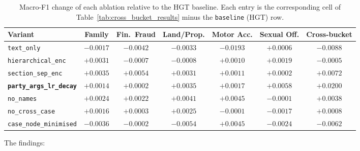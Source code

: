 \begin{table}[H]
  \centering
  \scriptsize
  \setlength{\tabcolsep}{4pt}
  \begin{adjustbox}{max width=\textwidth}
  \begin{tabular}{lcccccc}
    \toprule
    Variant & Family & Fin.\ Fraud & Land/Prop. & Motor Acc. & Sexual Off. & Cross-bucket \\
    \midrule
    \texttt{text\_only} & $-0.0017$ & $-0.0042$ & $-0.0033$ & $-0.0193$ & $+0.0006$ & $-0.0088$ \\
    \texttt{hierarchical\_enc} & $+0.0031$ & $-0.0007$ & $-0.0008$ & $+0.0010$ & $+0.0019$ & $-0.0005$ \\
    \texttt{section\_sep\_enc} & $+0.0035$ & $+0.0054$ & $+0.0031$ & $+0.0011$ & $+0.0002$ & $+0.0072$ \\
    \textbf{\texttt{party\_args\_lr\_decay}} & $+0.0014$ & $+0.0002$ & $+0.0035$ & $+0.0017$ & $+0.0058$ & $\mathbf{+0.0200}$ \\
    \texttt{no\_names} & $+0.0024$ & $+0.0022$ & $+0.0041$ & $+0.0045$ & $-0.0001$ & $+0.0038$ \\
    \texttt{no\_cross\_case} & $+0.0016$ & $+0.0003$ & $+0.0025$ & $-0.0001$ & $-0.0017$ & $+0.0008$ \\
    \texttt{case\_node\_minimised} & $-0.0036$ & $-0.0002$ & $-0.0054$ & $+0.0045$ & $-0.0024$ & $-0.0062$ \\
    \bottomrule
  \end{tabular}
  \end{adjustbox}
  \caption{Macro-F1 change of each ablation relative to the HGT
  baseline. Each entry is the corresponding cell of
  Table~\ref{tab:cross_bucket_results} minus the
  \texttt{baseline} (HGT) row.}
  \label{tab:ablation_delta}
\end{table}

The findings:

